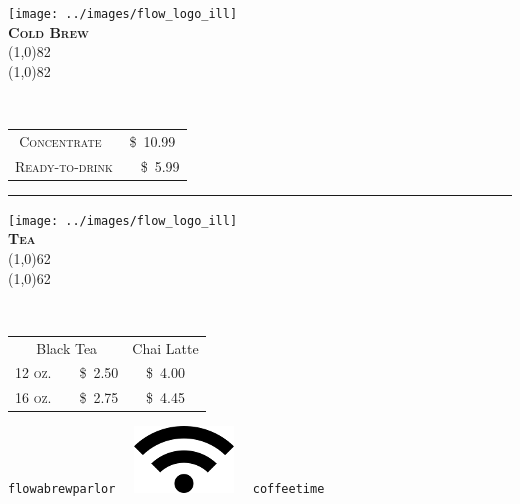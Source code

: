\documentclass[letterpaper, 12pt]{article}%
\newcommand{\ill}{
\texttt{[image: ../images/flow\_logo\_ill]} %
}
\newcommand{\menuentry}[2]{
 \emph{#1}\\ %
 \vspace*{\fill}
 {#2} %
}
\newcommand{\menuitem}[4]{
 \centering
  \ill\\
  \smallskip\vspace{0.1em}
  \textbf{\sffamily \textsc{\large#2}}\vspace{-1ex}\\
  \line(1,0){#1}\vspace{-2ex}\\
  \line(1,0){#1}\vspace{0.5ex}\\
  \smallskip
  \menuentry{#3}{#4}
}
\newcommand{\flowtherefore}{~~\raisebox{0.2ex}{$\therefore$}~~}
\newcommand{\price}[2]{
 \textsc{\small#1}\flowtherefore\$~\textsc{\small#2}
}
\newcommand{\varprice}[1]{
 \$~\textsc{\small#1}
}
\begin{document}
\newlength{\coffeerowtwo}
\setlength{\coffeerowtwo}{0.18\textwidth}
{\centering
   
    
 \begin{minipage}[t][\coffeerowtwo][b]{0.3\textwidth}
  \centering
  \menuitem{82}{
   Cold Brew}{\vspace{-1ex}
   }{
   \begin{tabular}{@{} c @{}}
   \price{Concentrate}{10.99}\\
   \price{Ready-to-drink}{5.99}\\
   \end{tabular}
   
   \rule{0pt}{2.2em}
    
  }
 \end{minipage} 
 \rule{3em}{0pt}
 \begin{minipage}[t][\coffeerowtwo][b]{0.3\textwidth}
  \centering
  \menuitem{62}{
   Tea}{
   }{
   \begin{tabular}{@{} c c @{}}
   Black Tea & Chai Latte\\
   \price{12 oz.}{2.50} & \varprice{4.00}\\
   \price{16 oz.}{2.75} & \varprice{4.45}\\
   \end{tabular}
   
   \rule{0pt}{1.2em}
    
  }
 \end{minipage} 
 
}



{\centering
 \texttt{\large flowabrewparlor}
 ~~\includegraphics{wifi}~~
 \texttt{\large coffeetime}
 \vspace{0.5em}
 
} 
\end{document}
